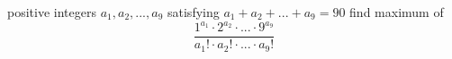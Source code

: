 positive integers $a_1, a_2, . . . , a_9$ satisfying $a_1+a_2+ . . . +a_9 =90$
find maximum of $$\frac{1^{a_1} \cdot 2^{a_2} \cdot  . . . \cdot 9^{a_9}}{a_1! \cdot a_2! \cdot . . . \cdot a_9!}$$
